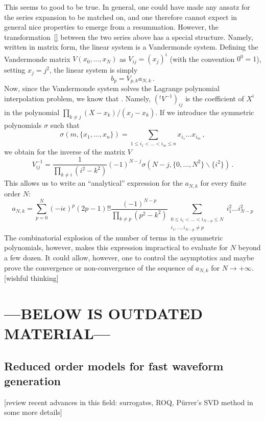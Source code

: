 \documentclass[aps,showpacs,%
prd,superscriptaddress,nofootinbib]{revtex4}
\newcommand{\be}{\begin{equation}}
\newcommand{\ee}{\end{equation}}
\begin{document}
This seems to good to be true. In general, one could have made any ansatz for the series expansion to be matched on, and one therefore cannot expect in general nice properties to emerge from a resummation. However, the transformation~\eqref{} between the two series above has a special structure. Namely, written in matrix form, the linear system is a Vandermonde system. Defining the Vandermonde matrix $V(x_{0},\dots,x_{N})$ as $V_{ij} = (x_{j})^{i}$ (with the convention $0^{0} = 1$), setting $x_{j} = j^{2}$, the linear system is simply
%
\be
	b_{p} = V_{p,k} a_{N,k} \,.
\ee
%
Now, since the Vandermonde system solves the Lagrange polynomial interpolation problem, we know that . Namely, $({}^{t}V^{-1})_{ij}$ is the coefficient of $X^{i}$ in the polynomial $\prod_{k\neq j} (X-x_{k})/(x_{j} - x_{k})$. If we introduce the symmetric polynomials $\sigma$ such that
%
\be	
	\sigma(m, \{x_{1}, \dots, x_{n}\}) = \sum\limits_{1\leq i_{1}<\dots<i_{m}\leq n} x_{i_{1}}\dots x_{i_{m}} \,,
\ee
%
we obtain for the inverse of the matrix $V$
%
\be
	V^{-1}_{ij} = \frac{1}{\prod_{k\neq i} (i^{2} - k^{2})} (-1)^{N-j} \sigma(N-j, \{0,\dots,N^{2}\}\backslash \{i^{2}\}) \,.
\ee
%
This allows us to write an ``analytical'' expression for the $a_{N,k}$ for every finite order $N$:
%
\be
	a_{N,k} = \sum\limits_{p=0}^{N} (-i\epsilon)^{p}(2p-1)!! \frac{(-1)^{N-p}}{\prod_{k\neq p} (p^{2}-k^{2})} \sum\limits_{\substack{ 0 \leq i_{1} < \dots < i_{N-p} \leq N \\ i_{1}, \dots, i_{N-p} \neq p}} i_{1}^{2}\dots i_{N-p}^{2}
\ee
%
The combinatorial explosion of the number of terms in the symmetric polynomials, however, makes this expression impractical to evaluate for $N$ beyond a few dozen. It could allow, however, one to control the asymptotics and maybe prove the convergence or non-convergence of the sequence of $a_{N,k}$ for $N\rightarrow +\infty$. [wishful thinking]

\section*{---BELOW IS OUTDATED MATERIAL---}


\subsection{Reduced order models for fast waveform generation}
\label{subsec:rom}

[review recent advances in this field: surrogates, ROQ, P\"urrer's SVD method in some more details]
\end{document}

